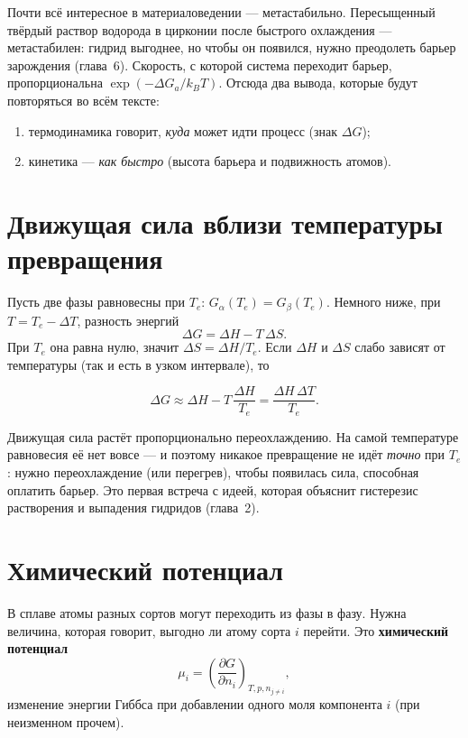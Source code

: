 
Почти всё интересное в материаловедении --- метастабильно. Пересыщенный твёрдый раствор водорода в цирконии
после быстрого охлаждения --- метастабилен: гидрид выгоднее, но чтобы он появился, нужно преодолеть барьер
зарождения (глава~6). Скорость, с которой система переходит барьер, пропорциональна $\exp(-\Delta G_a/k_BT)$.
Отсюда два вывода, которые будут повторяться во всём тексте:
\begin{enumerate}
\item термодинамика говорит, \emph{куда} может идти процесс (знак $\Delta G$);
\item кинетика --- \emph{как быстро} (высота барьера и подвижность атомов).
\end{enumerate}

\section{Движущая сила вблизи температуры превращения}

Пусть две фазы равновесны при $T_e$: $G_\alpha(T_e) = G_\beta(T_e)$. Немного ниже, при $T = T_e - \Delta T$,
разность энергий
\[
\Delta G = \Delta H - T\,\Delta S .
\]
При $T_e$ она равна нулю, значит $\Delta S = \Delta H/T_e$. Если $\Delta H$ и $\Delta S$ слабо зависят от
температуры (так и есть в узком интервале), то
\begin{keyf}
\[
\Delta G \approx \Delta H - T\,\frac{\Delta H}{T_e} = \frac{\Delta H\,\Delta T}{T_e}.
\]
\end{keyf}
Движущая сила растёт пропорционально переохлаждению. На самой температуре равновесия её нет вовсе --- и поэтому
никакое превращение не идёт \emph{точно} при $T_e$: нужно переохлаждение (или перегрев), чтобы появилась сила,
способная оплатить барьер. Это первая встреча с идеей, которая объяснит гистерезис растворения и выпадения
гидридов (глава~2).

\section{Химический потенциал}

В сплаве атомы разных сортов могут переходить из фазы в фазу. Нужна величина, которая говорит, выгодно ли
атому сорта $i$ перейти. Это \textbf{химический потенциал}
\begin{equation}
\mu_i = \left(\frac{\partial G}{\partial n_i}\right)_{T,p,n_{j\ne i}},
\end{equation}
изменение энергии Гиббса при добавлении одного моля компонента $i$ (при неизменном прочем).

